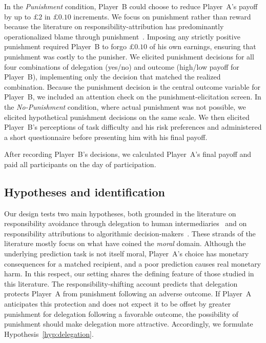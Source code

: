 In the \textit{Punishment} condition, Player~B could choose to reduce Player~A's payoff by up to $\pounds 2$ in $\pounds 0.10$ increments. We focus on punishment rather than reward because the literature on responsibility-attribution has predominantly operationalized blame through punishment~\citep{bartling_shifting_2012,coffman_intermediation_2011,steffel_passing_2016}. Imposing any strictly positive punishment required Player~B to forgo $\pounds 0.10$ of his own earnings, ensuring that punishment was costly to the punisher. We elicited punishment decisions for all four combinations of delegation (yes/no) and outcome (high/low payoff for Player~B), implementing only the decision that matched the realized combination. Because the punishment decision is the central outcome variable for Player~B, we included an attention check on the punishment-elicitation screen. In the \textit{No-Punishment} condition, where actual punishment was not possible, we elicited hypothetical punishment decisions on the same scale. We then elicited Player~B's perceptions of task difficulty and his risk preferences and administered a short questionnaire before presenting him with his final payoff.

After recording Player~B's decisions, we calculated Player~A's final payoff and paid all participants on the day of participation.

\subsection*{Hypotheses and identification}

Our design tests two main hypotheses, both grounded in the literature on responsibility avoidance through delegation to human intermediaries~\citep{bartling_shifting_2012,coffman_intermediation_2011,oexl_shifting_2013,hamman_self-interest_2010,hill_does_2015,steffel_passing_2016} and on responsibility attributions to algorithmic decision-makers~\citep{feier_hiding_2022,gogoll_rage_2018}. These strands of the literature mostly focus on what \citet{gogoll_rage_2018} have coined the \textit{moral} domain. Although the underlying prediction task is not itself moral, Player~A's choice has monetary consequences for a matched recipient, and a poor prediction causes real monetary harm. In this respect, our setting shares the defining feature of those studied in this literature.
The responsibility-shifting account predicts that delegation protects Player~A from punishment following an adverse outcome. If Player~A anticipates this protection and does not expect it to be offset by greater punishment for delegation following a favorable outcome, the possibility of punishment should make delegation more attractive. Accordingly, we formulate Hypothesis~\ref{hyp:delegation}.

